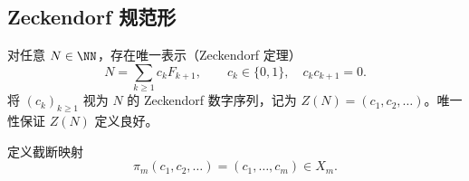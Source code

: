 \subsection{Zeckendorf 规范形}\label{subsec:folding-zeckendorf-canonical}

对任意 $N\in\NN$，存在唯一表示（Zeckendorf 定理）
\[
N=\sum_{k\ge1}c_k F_{k+1},\qquad c_k\in\{0,1\},\quad c_kc_{k+1}=0.
\]
将 $(c_k)_{k\ge1}$ 视为 $N$ 的 Zeckendorf 数字序列，记为 $Z(N)=(c_1,c_2,\dots)$。唯一性保证 $Z(N)$ 定义良好。

定义截断映射
\[
\pi_m(c_1,c_2,\dots)=(c_1,\dots,c_m)\in X_m.
\]
